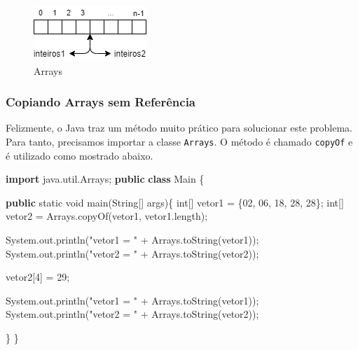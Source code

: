 \documentclass[
]{book}
\newenvironment{Shaded}{\begin{snugshade}}{\end{snugshade}}
\newcommand{\BaseNTok}[1]{\textcolor[rgb]{0.00,0.00,0.81}{#1}}
\newcommand{\BuiltInTok}[1]{#1}
\newcommand{\DataTypeTok}[1]{\textcolor[rgb]{0.13,0.29,0.53}{#1}}
\newcommand{\DecValTok}[1]{\textcolor[rgb]{0.00,0.00,0.81}{#1}}
\newcommand{\FunctionTok}[1]{\textcolor[rgb]{0.00,0.00,0.00}{#1}}
\newcommand{\ImportTok}[1]{#1}
\newcommand{\KeywordTok}[1]{\textcolor[rgb]{0.13,0.29,0.53}{\textbf{#1}}}
\newcommand{\NormalTok}[1]{#1}
\newcommand{\StringTok}[1]{\textcolor[rgb]{0.31,0.60,0.02}{#1}}
\begin{document}
\begin{figure}
\centering
\includegraphics{imagens/arrays.png}
\caption{Arrays}
\end{figure}

\hypertarget{copiando-arrays-sem-referuxeancia}{%
\subsubsection{Copiando Arrays sem Referência}\label{copiando-arrays-sem-referuxeancia}}

Felizmente, o Java traz um método muito prático para solucionar este problema. Para tanto, precisamos importar a classe \texttt{Arrays}. O método é chamado \texttt{copyOf} e é utilizado como mostrado abaixo.

\begin{Shaded}
\begin{Highlighting}[]
\KeywordTok{import}\ImportTok{ java.util.Arrays;}
\KeywordTok{public} \KeywordTok{class}\NormalTok{ Main \{}

    \KeywordTok{public} \DataTypeTok{static} \DataTypeTok{void} \FunctionTok{main}\NormalTok{(}\BuiltInTok{String}\NormalTok{[] args)\{}
        \DataTypeTok{int}\NormalTok{[] vetor1 = \{}\BaseNTok{02}\NormalTok{, }\BaseNTok{06}\NormalTok{, }\DecValTok{18}\NormalTok{, }\DecValTok{28}\NormalTok{, }\DecValTok{28}\NormalTok{\};}
        \DataTypeTok{int}\NormalTok{[] vetor2 = }\BuiltInTok{Arrays}\NormalTok{.}\FunctionTok{copyOf}\NormalTok{(vetor1, vetor1.}\FunctionTok{length}\NormalTok{);}

        \BuiltInTok{System}\NormalTok{.}\FunctionTok{out}\NormalTok{.}\FunctionTok{println}\NormalTok{(}\StringTok{"vetor1 = "}\NormalTok{ + }\BuiltInTok{Arrays}\NormalTok{.}\FunctionTok{toString}\NormalTok{(vetor1));}
        \BuiltInTok{System}\NormalTok{.}\FunctionTok{out}\NormalTok{.}\FunctionTok{println}\NormalTok{(}\StringTok{"vetor2 = "}\NormalTok{ + }\BuiltInTok{Arrays}\NormalTok{.}\FunctionTok{toString}\NormalTok{(vetor2));}

\NormalTok{        vetor2[}\DecValTok{4}\NormalTok{] = }\DecValTok{29}\NormalTok{;}

        \BuiltInTok{System}\NormalTok{.}\FunctionTok{out}\NormalTok{.}\FunctionTok{println}\NormalTok{(}\StringTok{"vetor1 = "}\NormalTok{ + }\BuiltInTok{Arrays}\NormalTok{.}\FunctionTok{toString}\NormalTok{(vetor1));}
        \BuiltInTok{System}\NormalTok{.}\FunctionTok{out}\NormalTok{.}\FunctionTok{println}\NormalTok{(}\StringTok{"vetor2 = "}\NormalTok{ + }\BuiltInTok{Arrays}\NormalTok{.}\FunctionTok{toString}\NormalTok{(vetor2));}
        
\NormalTok{    \}}
\NormalTok{\}}
\end{Highlighting}
\end{Shaded}
\end{document}
